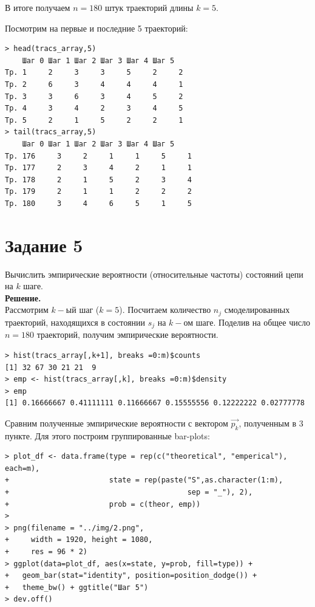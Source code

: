 \documentclass[14pt,a4paper]{scrartcl}
\begin{document}
В итоге получаем $n=180$ штук траекторий длины $k=5$.

Посмотрим на первые и последние 5 траекторий:

\begin{verbatim}
> head(tracs_array,5)
	Шаг 0 Шаг 1 Шаг 2 Шаг 3 Шаг 4 Шаг 5
Тр. 1     2     3     3     5     2     2
Тр. 2     6     3     4     4     4     1
Тр. 3     3     6     3     4     5     2
Тр. 4     3     4     2     3     4     5
Тр. 5     2     1     5     2     2     1
> tail(tracs_array,5)
	Шаг 0 Шаг 1 Шаг 2 Шаг 3 Шаг 4 Шаг 5
Тр. 176     3     2     1     1     5     1
Тр. 177     2     3     4     2     1     1
Тр. 178     2     1     5     2     3     4
Тр. 179     2     1     1     2     2     2
Тр. 180     3     4     6     5     1     5
\end{verbatim}



\section*{Задание 5}
Вычислить эмпирические вероятности (относительные частоты) состояний  цепи на $k$ шаге.\\
\textbf{Решение.}\\

Рассмотрим $k-$ый шаг ($k=5$). Посчитаем количество $n_j$ смоделированных траекторий, находящихся в состоянии $s_j$ на $k-$ом шаге. Поделив на общее число $n=180$ траекторий, получим эмпирические вероятности. 

\begin{verbatim}
> hist(tracs_array[,k+1], breaks =0:m)$counts
[1] 32 67 30 21 21  9
> emp <- hist(tracs_array[,k], breaks =0:m)$density
> emp
[1] 0.16666667 0.41111111 0.11666667 0.15555556 0.12222222 0.02777778
\end{verbatim}

Сравним полученные эмпирические вероятности с вектором $\vec{p_k}$, полученным в 3 пункте. Для этого построим группированные bar-plots:

\begin{verbatim}
> plot_df <- data.frame(type = rep(c("theoretical", "emperical"), each=m),
+                       state = rep(paste("S",as.character(1:m),
+										  sep = "_"), 2),
+                       prob = c(theor, emp))
> 
> png(filename = "../img/2.png",
+     width = 1920, height = 1080,
+     res = 96 * 2)
> ggplot(data=plot_df, aes(x=state, y=prob, fill=type)) +
+   geom_bar(stat="identity", position=position_dodge()) + 
+   theme_bw() + ggtitle("Шаг 5")
> dev.off()
\end{verbatim}
\end{document}
